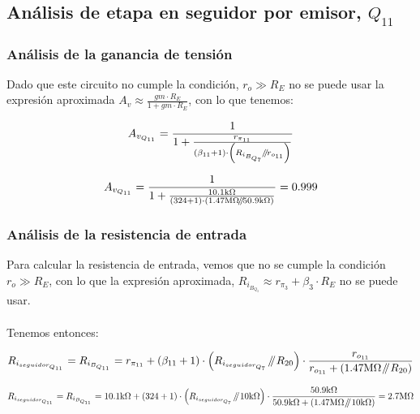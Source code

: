 
\subsection{Análisis de etapa en seguidor por emisor, $Q_{11}$}

\subsubsection{Análisis de la ganancia de tensión}

Dado que este circuito no cumple la condición, $r_{o} \gg R_{E}$ no se puede usar la expresión aproximada $A_{v} \approx \frac{gm \cdot R_{E}}{1 + gm \cdot R_{E}}$, con lo que tenemos:

\begin{equation}
A_{v_{Q_{11}}} = \frac{1}{1 + \frac{r_{\pi_{11}}}{  \left(  \beta_{11} + 1 \right) \cdot \left(  R_{i_{B_{Q_{7}}}} \parallelresistors r_{o_{11}}  \right)  } }
\end{equation}

\begin{equation*}
A_{v_{Q_{11}}} = \frac{1}{1 + \frac{10.1 \si[per-mode=symbol]{\kilo\ohm}}{  \left(  324 + 1 \right) \cdot \left(  1.47 \si[per-mode=symbol]{\mega\ohm} \parallelresistors 50.9 \si[per-mode=symbol]{\kilo\ohm}  \right)  } } = 0.999
\end{equation*}


\subsubsection{Análisis de la resistencia de entrada}

Para calcular la  resistencia de entrada, vemos que no se cumple la condición $r_{o} \gg R_{E}$, con lo que la expresión aproximada, $ R_{i_{B_{Q_{3}}}} \approx r_{\pi_{3}} + \beta_{3} \cdot R_{E}$ no se puede usar.\\ \\

Tenemos entonces:

\begin{equation}
R_{i_{seguidor_{Q_{11}}}} = R_{i_{B_{Q_{11}}}} = r_{\pi_{11}} + \left( \beta_{11} + 1 \right) \cdot  \left(  R_{i_{seguidor_{Q_{7}}}} \parallelresistors R_{20}   \right)  \cdot \frac{  r_{o_{11}} }{  r_{o_{11}} + \left(  1.47 \si[per-mode=symbol]{\mega\ohm} \parallelresistors R_{20}   \right)  }
\end{equation}


\begin{equation*}
R_{i_{seguidor_{Q_{11}}}} = R_{i_{B_{Q_{11}}}} = 10.1 \si[per-mode=symbol]{\kilo\ohm} + \left( 324 + 1 \right) \cdot  \left(  R_{i_{seguidor_{Q_{7}}}} \parallelresistors 10 \si[per-mode=symbol]{\kilo\ohm}   \right)  \cdot \frac{  50.9 \si[per-mode=symbol]{\kilo\ohm} }{  50.9 \si[per-mode=symbol]{\kilo\ohm} + \left(  1.47 \si[per-mode=symbol]{\mega\ohm} \parallelresistors 10 \si[per-mode=symbol]{\kilo\ohm}   \right)  } = 2.7 \si[per-mode=symbol]{\mega\ohm}
\end{equation*}


